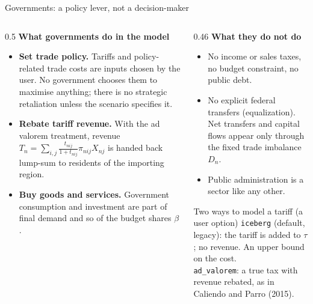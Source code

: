 \documentclass[aspectratio=169,9pt,t]{beamer}
\newcommand{\key}[1]{\textbf{\color{ipnavy}#1}}
\begin{document}
\begin{frame}{Governments: a policy lever, not a decision-maker}
  \begin{columns}[T]
    \begin{column}{0.5\textwidth}
      \textbf{What governments do in the model}
      \begin{itemize}
        \item \key{Set trade policy.} Tariffs and policy-related trade
              costs are inputs chosen by the user. No government chooses
              them to maximise anything; there is no strategic
              retaliation unless the scenario specifies it.
        \item \key{Rebate tariff revenue.} With the ad valorem treatment,
              revenue
              $T_n=\sum_{i,j}\frac{t_{nij}}{1+t_{nij}}\pi_{nij}X_{nj}$
              is handed back lump-sum to residents of the importing
              region.
        \item \key{Buy goods and services.} Government consumption and
              investment are part of final demand and so of the budget
              shares $\beta$.
      \end{itemize}
    \end{column}
    \begin{column}{0.46\textwidth}
      \textbf{What they do not do}
      \begin{itemize}
        \item No income or sales taxes, no budget constraint, no public
              debt.
        \item No explicit federal transfers (equalization). Net transfers
              and capital flows appear only through the fixed trade
              imbalance $D_n$.
        \item Public administration is a sector like any other.
      \end{itemize}
      \begin{block}{Two ways to model a tariff (a user option)}
        \small
        \texttt{iceberg} (default, legacy): the tariff is added to $\tau$;
        no revenue. An upper bound on the cost.\\[0.3em]
        \texttt{ad\_valorem}: a true tax with revenue rebated, as in
        Caliendo and Parro (2015).
      \end{block}
    \end{column}
  \end{columns}
\end{frame}
\end{document}
